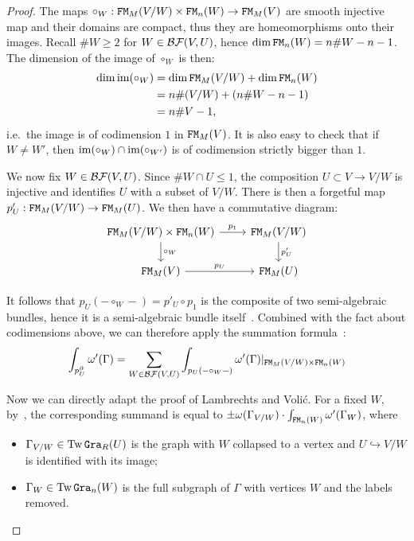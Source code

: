 \begin{proof}
  The maps $\circ_{W} : \mathtt{FM}_{M}(V/W) \times \mathtt{FM}_{n}(W) \to \mathtt{FM}_{M}(V)$ are smooth injective map and their domains are compact, thus they are homeomorphisms onto their images.
  Recall $\# W \geq 2$ for $W \in \mathcal{BF}(V,U)$, hence $\dim \mathtt{FM}_{n}(W) = n \#W - n - 1$.
  The dimension of the image of $\circ_{W}$ is then:
  \begin{equation}
    \begin{aligned}
      \dim \operatorname{im}(\circ_{W})
      & = \dim \mathtt{FM}_{M}(V/W) + \dim \mathtt{FM}_{n}(W) \\
      & = n \# (V/W) + (n \#W - n - 1) \\
      & = n \#V - 1,
    \end{aligned}
  \end{equation}
  i.e.\ the image is of codimension $1$ in $\mathtt{FM}_{M}(V)$.
  It is also easy to check that if $W \neq W'$, then $\operatorname{im}(\circ_{W}) \cap \operatorname{im}(\circ_{W'})$ is of codimension strictly bigger than $1$.

  We now fix $W \in \mathcal{BF}(V,U)$.
  Since $\# W \cap U \leq 1$, the composition $U \subset V \to V/W$ is injective and identifies $U$ with a subset of $V/W$.
  There is then a forgetful map $p_{U}' : \mathtt{FM}_{M}(V/W) \to \mathtt{FM}_{M}(U)$.
  We then have a commutative diagram:
  \begin{equation}
    \begin{tikzcd}
      \FM_{M}(V/W) \times \FM_{n}(W) \dar{\circ_{W}} \rar{p_{1}} & \FM_{M}(V/W) \dar{p_{U}'} \\
      \FM_{M}(V) \rar{p_{U}} & \FM_{M}(U)
    \end{tikzcd}
    \label{cnf.eq:6}
  \end{equation}

  It follows that $p_{U}(- \circ_{W} -) = p'_{U} \circ p_{1}$ is the composite of two semi-algebraic bundles, hence it is a semi-algebraic bundle itself~\cite[Proposition 8.5]{HardtLambrechtsTurchinVolic2011}.
  Combined with the fact about codimensions above, we can therefore apply the summation formula~\cite[Proposition 8.11]{HardtLambrechtsTurchinVolic2011}:
  \begin{equation}
    \label{cnf.eq.sum-chain-map}
    \int_{p_{U}^{\partial}} \omega'(\Gamma) = \sum_{W \in \mathcal{BF}(V,U)} \int_{p_{U}(- \circ_{W} -)} \omega'(\Gamma)|_{\mathtt{FM}_{M}(V/W) \times \mathtt{FM}_{n}(W)}
  \end{equation}

  Now we can directly adapt the proof of Lambrechts and Volić.
  For a fixed $W$, by~\cite[Proposition 8.13]{HardtLambrechtsTurchinVolic2011}, the corresponding summand is equal to $\pm \omega(\Gamma_{V/W}) \cdot \int_{\mathtt{FM}_{n}(W)} \omega'(\Gamma_{W})$, where
  \begin{itemize}
  \item $\Gamma_{V/W} \in \operatorname{Tw}\mathtt{Gra}_{R}(U)$ is the graph with $W$ collapsed to a vertex and $U \hookrightarrow V/W$ is identified with its image;
  \item $\Gamma_{W} \in \operatorname{Tw}\mathtt{Gra}_{n}(W)$ is the full subgraph of $\Gamma$ with vertices $W$ and the labels removed.
  \end{itemize}


\end{proof}
